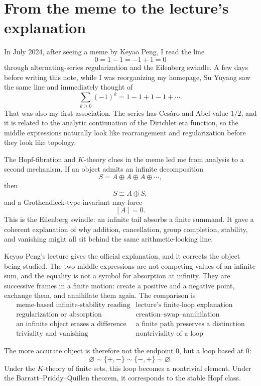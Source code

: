 
\section{From the meme to the lecture's explanation}

In July 2024, after seeing a meme by Keyao Peng, I read the line
\[
  0=1-1=-1+1=0
\]
through alternating-series regularization and the Eilenberg swindle.  A few days before writing this note, while I was reorganizing my homepage, Su Yuyang saw the same line and immediately thought of
\[
  \sum_{k\ge0}(-1)^k
  =
  1-1+1-1+\cdots.
\]
That was also my first association.  The series has Ces\`aro and Abel value \(1/2\), and it is related to the analytic continuation of the Dirichlet eta function, so the middle expressions naturally look like rearrangement and regularization before they look like topology.

The Hopf-fibration and \(K\)-theory clues in the meme led me from analysis to a second mechanism.  If an object admits an infinite decomposition
\[
  S=A\oplus A\oplus A\oplus\cdots,
\]
then
\[
  S\cong A\oplus S,
\]
and a Grothendieck-type invariant may force
\[
  [A]=0.
\]
This is the Eilenberg swindle: an infinite tail absorbs a finite summand.  It gave a coherent explanation of why addition, cancellation, group completion, stability, and vanishing might all sit behind the same arithmetic-looking line.

Keyao Peng's lecture gives the official explanation, and it corrects the object being studied.  The two middle expressions are not competing values of an infinite sum, and the equality is not a symbol for absorption at infinity.  They are successive frames in a finite motion: create a positive and a negative point, exchange them, and annihilate them again.  The comparison is
\[
\begin{array}{c|c}
\text{meme-based infinite-stability reading} & \text{lecture's finite-loop explanation}\\
\hline
\text{regularization or absorption} & \text{creation--swap--annihilation}\\
\text{an infinite object erases a difference} & \text{a finite path preserves a distinction}\\
\text{triviality and vanishing} & \text{nontriviality of a loop}
\end{array}
\]

The more accurate object is therefore not the endpoint \(0\), but a loop based at \(0\):
\[
  \varnothing
  \sim
  \{+,-\}
  \sim
  \{-,+\}
  \sim
  \varnothing.
\]
Under the \(K\)-theory of finite sets, this loop becomes a nontrivial element.  Under the Barratt--Priddy--Quillen theorem, it corresponds to the stable Hopf class.

